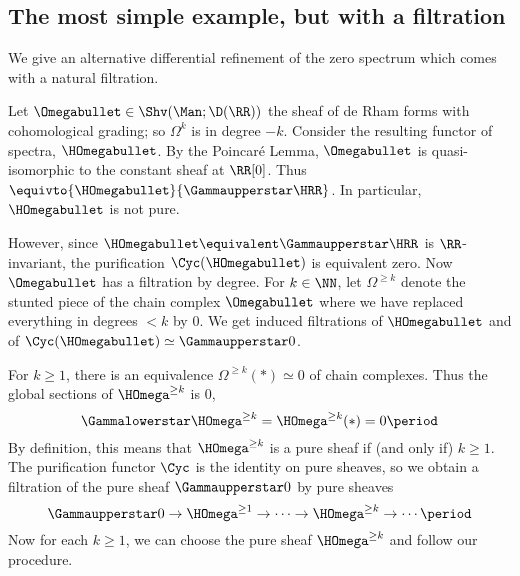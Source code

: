
\subsection{The most simple example, but with a filtration}\label{subsec:simplefilt} 

We give an alternative differential refinement of the zero spectrum which comes with a natural filtration.

\begin{nul}
	Let $\Omegabullet\in\Shv(\Man;\D(\RR))$ the sheaf of de Rham forms with cohomological grading; so $ \Omega^k $ is in degree $ -k $. 
	Consider the resulting functor of spectra, $\HOmegabullet$. 
	By the Poincaré Lemma, $\Omegabullet$ is quasi-isomorphic to the constant sheaf at $\RR[0]$. 
	Thus $ \equivto{\HOmegabullet}{\Gammaupperstar\HRR} $. 
	In particular, $\HOmegabullet$ is not pure. 
\end{nul}

However, since $ \HOmegabullet \equivalent \Gammaupperstar\HRR $ is $ \RR $-invariant, the purification $ \Cyc(\HOmegabullet) $ is equivalent zero.
Now $\Omegabullet$ has a filtration by degree. 
For $k\in\NN$, let $\Omega^{\geq k}$ denote the stunted piece of the chain complex $\Omegabullet$ where we have replaced everything in degrees $<k$ by $0$. 
We get induced filtrations of $\HOmegabullet$ and of $\Cyc(\HOmegabullet)\simeq\Gammaupperstar 0$.

For $k\geq 1$, there is an equivalence $\Omega^{\geq k}(*)\simeq 0$ of chain complexes. 
Thus the global sections of $\HOmega^{\geq k}$ is 0,
\begin{equation*}
	\Gammalowerstar \HOmega^{\geq k}= \HOmega^{\geq k}(*) = 0 \period
\end{equation*}
By definition, this means that $\HOmega^{\geq k}$ is a pure sheaf if (and only if) $k\geq 1$. 
The purification functor $\Cyc$ is the identity on pure sheaves, so we obtain a filtration of the pure sheaf $\Gammaupperstar 0$ by pure sheaves
\begin{equation*}
	\Gammaupperstar 0 \to \HOmega^{\geq 1}\to\cdots\to \HOmega^{\geq k}\to\cdots \period
\end{equation*}
Now for each $k\geq 1$, we can choose the pure sheaf $\HOmega^{\geq k}$ and follow our procedure.

